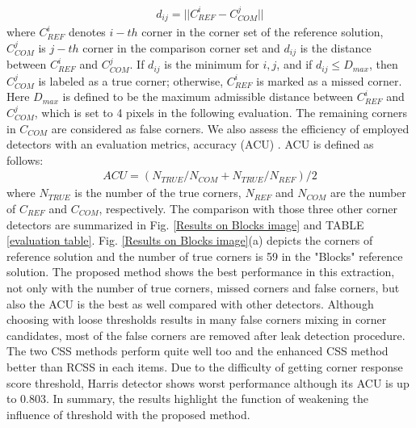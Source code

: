 \documentclass[letterpaper, 10 pt, conference]{ieeeconf}  %
\begin{document}
\begin{equation}
\begin{split}
d _ { ij} = || C _ { REF } ^ { i } - C _ { COM } ^ { j } ||
\end{split}
\label{evaluation equation}
\end{equation}
where $C _ { REF } ^ { i }$ denotes $i-th$ corner in the corner set of the reference solution, $C _ { COM } ^ { j }$ is $j-th$ corner in the comparison corner set and $d _ { ij}$ is the distance between $C _ { REF } ^ { i }$ and $C _ { COM } ^ { j }$. If $d _ {ij}$ is the minimum for ${i,j}$, and if $d _ {ij} \leq D _ {max} $, then $C _ { COM } ^ { j }$ is labeled as a true corner; otherwise, $C _ { REF } ^ { i }$ is marked as a missed corner. Here $D _ {max}$ is defined to be the maximum admissible distance between $C _ { REF } ^ { i }$ and $C _ { COM } ^ { j }$, which is set to 4 pixels in the following evaluation. The remaining corners in $C _ { COM }$ are considered as false corners. We also assess the efficiency of employed detectors with an evaluation metrics, accuracy (ACU) \cite{Topal2013A}. ACU is defined as follows:
\begin{equation}
\begin{split}
ACU = (N _ { TRUE }/N _ { COM } + N _ { TRUE }/N _ { REF })/2
\end{split}
\label{ACU}
\end{equation}
where $N _ { TRUE }$ is the number of the true corners, $N _ { REF }$ and $N _ { COM }$ are the number of $C _ { REF }$ and $C _ { COM }$, respectively. The comparison with those three other corner detectors are summarized in Fig. \ref{Results on Blocks image} and TABLE \ref{evaluation table}. Fig. \ref{Results on Blocks image}(a) depicts the corners of reference solution and the number of true corners is 59 in the "Blocks" reference solution. The proposed method shows the best performance in this extraction, not only with the number of true corners, missed corners and false corners, but also the ACU is the best as well compared with other detectors. Although choosing with loose thresholds results in many false corners mixing in corner candidates, most of the false corners are removed after leak detection procedure. The two CSS methods perform quite well too and the enhanced CSS method better than RCSS in each items. Due to the difficulty of getting corner response score threshold, Harris detector shows worst performance although its ACU is up to 0.803. In summary, the results highlight the function of weakening the influence of threshold with the proposed method.
\end{document}
